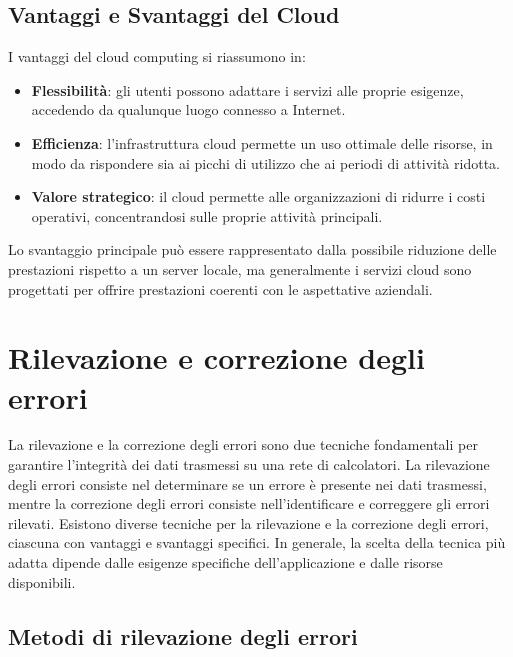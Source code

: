 \documentclass[12pt]{report}
\begin{document}
	\section{Vantaggi e Svantaggi del Cloud}
	I vantaggi del cloud computing si riassumono in:
	\begin{itemize}
		\item \textbf{Flessibilità}: gli utenti possono adattare i servizi alle proprie esigenze, accedendo da qualunque luogo connesso a Internet.
		\item \textbf{Efficienza}: l'infrastruttura cloud permette un uso ottimale delle risorse, in modo da rispondere sia ai picchi di utilizzo che ai periodi di attività ridotta.
		\item \textbf{Valore strategico}: il cloud permette alle organizzazioni di ridurre i costi operativi, concentrandosi sulle proprie attività principali.
	\end{itemize}
	Lo svantaggio principale può essere rappresentato dalla possibile riduzione delle prestazioni rispetto a un server locale, ma generalmente i servizi cloud sono progettati per offrire prestazioni coerenti con le aspettative aziendali.

	\chapter{Rilevazione e correzione degli errori}
	La rilevazione e la correzione degli errori sono due tecniche fondamentali per garantire l'integrità dei dati trasmessi su una rete di calcolatori. La rilevazione degli errori consiste nel determinare se un errore è presente nei dati trasmessi, mentre la correzione degli errori consiste nell'identificare e correggere gli errori rilevati. Esistono diverse tecniche per la rilevazione e la correzione degli errori, ciascuna con vantaggi e svantaggi specifici. In generale, la scelta della tecnica più adatta dipende dalle esigenze specifiche dell'applicazione e dalle risorse disponibili.

	\section{Metodi di rilevazione degli errori}
\end{document}
